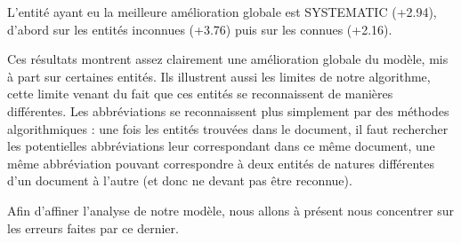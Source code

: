 \documentclass[PhD-Yoann-Dupont.tex]{subfiles}
\begin{document}
L'entité ayant eu la meilleure amélioration globale est SYSTEMATIC (+2.94), d'abord sur les entités inconnues (+3.76) puis sur les connues (+2.16).

Ces résultats montrent assez clairement une amélioration globale du modèle, mis à part sur certaines entités. Ils illustrent aussi les limites de notre algorithme, cette limite venant du fait que ces entités se reconnaissent de manières différentes. Les abbréviations se reconnaissent plus simplement par des méthodes algorithmiques : une fois les entités trouvées dans le document, il faut rechercher les potentielles abbréviations leur correspondant dans ce même document, une même abbréviation pouvant correspondre à deux entités de natures différentes d'un document à l'autre (et donc ne devant pas être reconnue).

Afin d'affiner l'analyse de notre modèle, nous allons à présent nous concentrer sur les erreurs faites par ce dernier.
\end{document}
